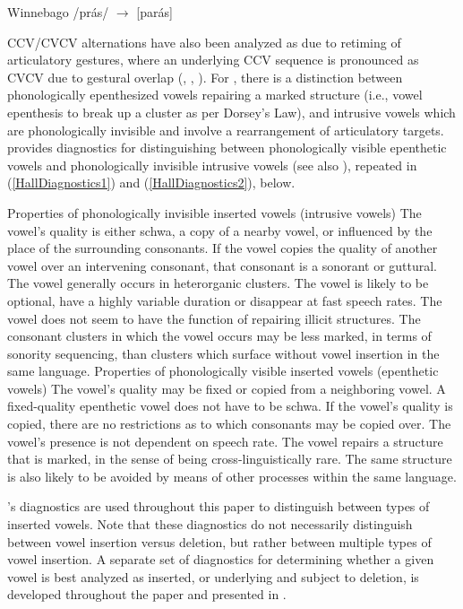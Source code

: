 \documentclass[output=paper,colorlinks,citecolor=brown]{langscibook}
\begin{document}
\ea
Winnebago /prás/ $\rightarrow$ [parás] \citep[27]{Miner:1979}
\z

CCV/CVCV alternations have also been analyzed as due to retiming of articulatory gestures, where an underlying CCV sequence is pronounced as CVCV due to gestural overlap (\cite{Hall:2003, Hall2006, Hall2011},  , ). For \citeauthor{Hall2006}, there is a distinction between phonologically epenthesized vowels repairing a marked structure (i.e., vowel epenthesis to break up a cluster as per Dorsey's Law), and intrusive vowels which are phonologically invisible and involve a rearrangement of articulatory targets. \citet[391]{Hall2006} provides diagnostics for distinguishing between phonologically visible epenthetic vowels and phonologically invisible intrusive vowels (see also ), repeated in (\ref{HallDiagnostics1}) and (\ref{HallDiagnostics2}), below.

\ea Properties of phonologically invisible inserted vowels (intrusive vowels) \citep[391]{Hall2006}\label{HallDiagnostics1}
	\ea The vowel's quality is either schwa, a copy of a nearby vowel, or influenced by the place of the surrounding consonants.
	\ex If the vowel copies the quality of another vowel over an intervening consonant, that consonant is a sonorant or guttural.
	\ex The vowel generally occurs in heterorganic clusters.
	\ex The vowel is likely to be optional, have a highly variable duration or disappear at fast speech rates.
	\ex The vowel does not seem to have the function of repairing illicit
	structures. The consonant clusters in which the vowel occurs may
	be less marked, in terms of sonority sequencing, than clusters which
	surface without vowel insertion in the same language.
\z
\ex Properties of phonologically visible inserted vowels (epenthetic vowels) \citep[391]{Hall2006}\label{HallDiagnostics2}
	\ea The vowel's quality may be fixed or copied from a neighboring vowel. A fixed-quality epenthetic vowel does not have to be schwa.
	\ex If the vowel’s quality is copied, there are no restrictions as to which consonants may be copied over.
	\ex The vowel’s presence is not dependent on speech rate.
	\ex The vowel repairs a structure that is marked, in the sense of being cross-linguistically rare. The same structure is also likely to be avoided by means of other processes within the same language.
\z
\z

\noindent \citeauthor{Hall2006}'s diagnostics are used throughout this paper to distinguish between types of inserted vowels. Note that these diagnostics do not necessarily distinguish between vowel insertion versus deletion, but rather between multiple types of vowel insertion. A separate set of diagnostics for determining whether a given vowel is best analyzed as inserted, or underlying and subject to deletion, is developed throughout the paper and presented in .
\end{document}
